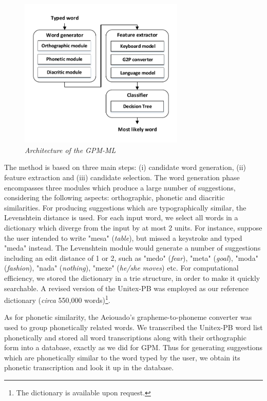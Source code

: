 \begin{figure}[h!]
  \centering
    \includegraphics[width=0.7\textwidth]{gfx/speller_architecture.pdf}
\caption{\label{fig:sys3-architecture} \it Architecture of the GPM-ML}
\end{figure}
The method is based on three main steps: (i) candidate word generation, (ii) feature extraction and (iii) candidate selection. 
The word generation phase encompasses three modules which produce a large number of suggestions, considering the following aspects: orthographic, phonetic and diacritic similarities.
For producing suggestions which are typographically similar, the Levenshtein distance is used. For each input word, we select all words in a dictionary which diverge from the input by at most 2 units. For instance, suppose the user intended to write "mesa" (\emph{table}),  
but missed a keystroke and typed "meda" instead. The Levenshtein module would generate a number of suggestions including an edit distance of 1 or 2, such as "medo" (\emph{fear}), "meta" (\emph{goal}), "moda" (\emph{fashion}), "nada" (\emph{nothing}), "mexe" (\emph{he/she moves}) etc. For computational efficiency, we stored the dictionary in a trie structure, in order to make it quickly searchable. A revised version of the Unitex-PB was employed as our reference dictionary (\emph{circa} 550,000 words)\footnote{The dictionary is available upon request.}.

As for phonetic similarity, the Aeiouado's grapheme-to-phoneme converter \cite{Mendonca2014} was used to group phonetically related words. We transcribed the Unitex-PB word list  phonetically and stored all word transcriptions along with their orthographic form into a database, exactly as we did for GPM. Thus for generating suggestions which are phonetically similar to the word typed by the user, we obtain its phonetic transcription and look it up in the database.


